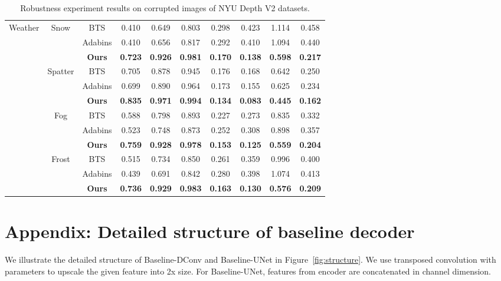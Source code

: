 \documentclass{article}
\begin{document}
\begin{table*}[!htbp]
{\begin{tabular}{l | c | c | ccccccc}
\multirow{12}{*}{Weather} & \multirow{3}{*}{Snow} & BTS & 0.410 & 0.649 & 0.803 & 0.298 & 0.423 & 1.114 & 0.458 \\
                                & & Adabins & 0.410 & 0.656 & 0.817 & 0.292 & 0.410 & 1.094 & 0.440  \\
& & \textbf{Ours} & \textbf{0.723} & \textbf{0.926} & \textbf{0.981} & \textbf{0.170} & \textbf{0.138} & \textbf{0.598} & \textbf{0.217} \\ \cmidrule{2-10}
      &  \multirow{3}{*}{Spatter} & BTS &0.705 & 0.878 & 0.945 & 0.176 & 0.168 & 0.642 & 0.250 \\
                                & & Adabins & 0.699 & 0.890 & 0.964 & 0.173 & 0.155 & 0.625 & 0.234 \\
& & \textbf{Ours} & \textbf{0.835} & \textbf{0.971} & \textbf{0.994} & \textbf{0.134} & \textbf{0.083} & \textbf{0.445} & \textbf{0.162} \\ \cmidrule{2-10}
    &  \multirow{3}{*}{Fog} & BTS & 0.588 & 0.798 & 0.893 & 0.227 & 0.273 & 0.835 & 0.332 \\
                                & & Adabins & 0.523 & 0.748 & 0.873 & 0.252 & 0.308 & 0.898 & 0.357 \\
& & \textbf{Ours} & \textbf{0.759} & \textbf{0.928} & \textbf{0.978} & \textbf{0.153} & \textbf{0.125} & \textbf{0.559} & \textbf{0.204} \\ \cmidrule{2-10}
    &  \multirow{3}{*}{Frost} & BTS & 0.515 & 0.734 & 0.850 & 0.261 & 0.359 & 0.996 & 0.400 \\
                                & & Adabins & 0.439 & 0.691 & 0.842 & 0.280 & 0.398 & 1.074 & 0.413 \\
& & \textbf{Ours} & \textbf{0.736} & \textbf{0.929} & \textbf{0.983} & \textbf{0.163} & \textbf{0.130} & \textbf{0.576} & \textbf{0.209} \\ \midrule
\end{tabular}
}
\caption{Robustness experiment results on corrupted images of NYU Depth V2 datasets.}
\label{tab:robustness_full}
\end{table*}


\section{Appendix: Detailed structure of baseline decoder}

We illustrate the detailed structure of Baseline-DConv and Baseline-UNet in  Figure~\ref{fig:structure}. We use transposed convolution with  parameters to upscale the given feature into 2x size. For Baseline-UNet, features from encoder  are concatenated in channel dimension.
\end{document}
